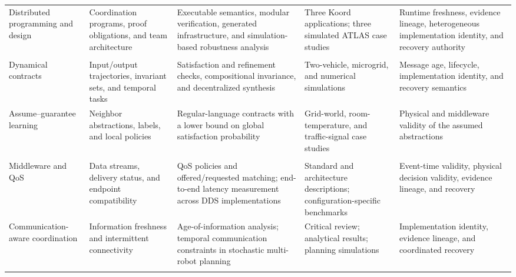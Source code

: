 \begin{table}[!t]
\begin{tabularx}{\textwidth}{@{}P{0.15\textwidth}P{0.15\textwidth}P{0.21\textwidth}P{0.21\textwidth}Y@{}}
    Distributed programming and design \cite{ghosh2020koord,harbin2023design}
      & Coordination programs, proof obligations, and team architecture
      & Executable semantics, modular verification, generated infrastructure, and simulation-based robustness analysis
      & Three Koord applications; three simulated ATLAS case studies
      & Runtime freshness, evidence lineage, heterogeneous implementation identity, and recovery authority \\
    \addlinespace[2pt]
     \\
    Dynamical contracts \cite{sharf2021dynamical,chen2019invariance,liu2022stlcontracts}
      & Input/output trajectories, invariant sets, and temporal tasks
      & Satisfaction and refinement checks, compositional invariance, and decentralized synthesis
      & Two-vehicle, microgrid, and numerical simulations
      & Message age, lifecycle, implementation identity, and recovery semantics \\
    Assume--guarantee learning \cite{kazemi2024agrl}
      & Neighbor abstractions, labels, and local policies
      & Regular-language contracts with a lower bound on global satisfaction probability
      & Grid-world, room-temperature, and traffic-signal case studies
      & Physical and middleware validity of the assumed abstractions \\
    \addlinespace[2pt]
     \\
    Middleware and QoS \cite{macenski2022ros2,omg2015dds,maruyama2016ros2,kronauer2021latency}
      & Data streams, delivery status, and endpoint compatibility
      & QoS policies and offered/requested matching; end-to-end latency measurement across DDS implementations
      & Standard and architecture descriptions; configuration-specific benchmarks
      & Event-time validity, physical decision validity, evidence lineage, and recovery \\
    Communication-aware coordination \cite{gielis2022communications,silva2026probabilistic,kaul2012aoi}
      & Information freshness and intermittent connectivity
      & Age-of-information analysis; temporal communication constraints in stochastic multi-robot planning
      & Critical review; analytical results; planning simulations
      & Implementation identity, evidence lineage, and coordinated recovery \\
    \addlinespace[2pt]
     \\

\end{tabularx}
\end{table}
